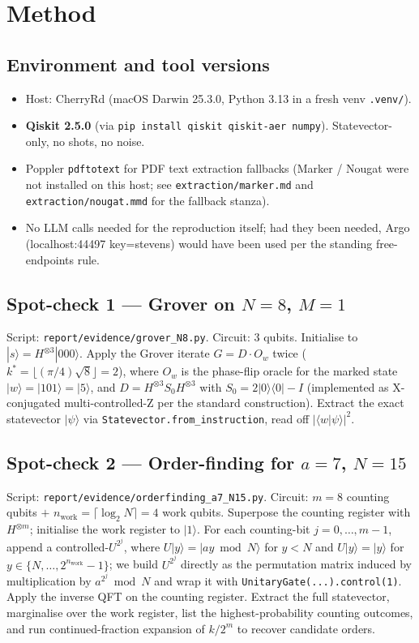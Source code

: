 \documentclass[11pt]{article}
\begin{document}
\section{Method}
\subsection{Environment and tool versions}
\begin{itemize}\itemsep=0pt
  \item Host: CherryRd (macOS Darwin 25.3.0, Python 3.13 in a fresh venv \verb|.venv/|).
  \item \textbf{Qiskit 2.5.0} (via \verb|pip install qiskit qiskit-aer numpy|). Statevector-only, no shots, no noise.
  \item Poppler \verb|pdftotext| for PDF text extraction fallbacks (Marker / Nougat were not installed on this host; see \verb|extraction/marker.md| and \verb|extraction/nougat.mmd| for the fallback stanza).
  \item No LLM calls needed for the reproduction itself; had they been needed, Argo (localhost:44497 key=stevens) would have been used per the standing free-endpoints rule.
\end{itemize}

\subsection{Spot-check 1 --- Grover on $N{=}8$, $M{=}1$}
Script: \verb|report/evidence/grover_N8.py|.
Circuit: 3 qubits. Initialise to $|s\rangle{=}H^{\otimes 3}|000\rangle$. Apply the Grover iterate $G{=}D\cdot O_w$ twice ($k^*{=}\lfloor(\pi/4)\sqrt 8\rfloor{=}2$), where $O_w$ is the phase-flip oracle for the marked state $|w\rangle{=}|101\rangle{=}|5\rangle$, and $D{=}H^{\otimes 3}S_0 H^{\otimes 3}$ with $S_0{=}2|0\rangle\langle 0|{-}I$ (implemented as X-conjugated multi-controlled-Z per the standard construction). Extract the exact statevector $|\psi\rangle$ via \verb|Statevector.from_instruction|, read off $|\langle w|\psi\rangle|^2$.

\subsection{Spot-check 2 --- Order-finding for $a{=}7$, $N{=}15$}
Script: \verb|report/evidence/orderfinding_a7_N15.py|.
Circuit: $m{=}8$ counting qubits $+$ $n_\text{work}{=}\lceil\log_2 N\rceil{=}4$ work qubits. Superpose the counting register with $H^{\otimes m}$; initialise the work register to $|1\rangle$. For each counting-bit $j{=}0,\dots,m{-}1$, append a controlled-$U^{2^j}$, where $U|y\rangle=|ay\bmod N\rangle$ for $y<N$ and $U|y\rangle=|y\rangle$ for $y\in\{N,\dots,2^{n_\text{work}}{-}1\}$; we build $U^{2^j}$ directly as the permutation matrix induced by multiplication by $a^{2^j}\bmod N$ and wrap it with \verb|UnitaryGate(...).control(1)|. Apply the inverse QFT on the counting register. Extract the full statevector, marginalise over the work register, list the highest-probability counting outcomes, and run continued-fraction expansion of $k/2^m$ to recover candidate orders.
\end{document}

